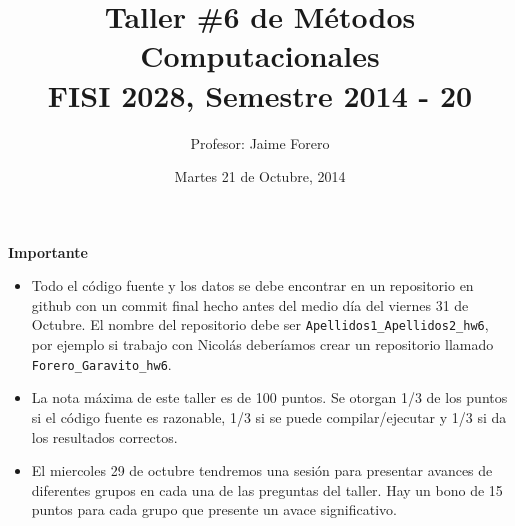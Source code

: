 \documentclass{article}
\title{Taller \#6 de M\'etodos Computacionales\\ FISI 2028, Semestre 2014 - 20}
\author{Profesor: Jaime Forero}
\date{Martes 21 de Octubre, 2014}
\begin{document}
\maketitle
\thispagestyle{empty}


{\bf Importante}
\begin{itemize}

\item Todo el c\'odigo fuente y los datos se debe encontrar en un
  repositorio en github con un commit final hecho antes del medio
  d\'ia del viernes 31 de Octubre. El nombre del repositorio debe ser
  \verb"Apellidos1_Apellidos2_hw6", por ejemplo si trabajo con
  Nicol\'as deber\'iamos crear un repositorio llamado
  \verb"Forero_Garavito_hw6".  

\item 
  La nota m\'axima de este taller es de 100 puntos. Se otorgan 1/3
  de los puntos si el c\'odigo fuente es razonable, 1/3 si se puede
  compilar/ejecutar y 1/3 si da los resultados correctos.  

\item
  El miercoles 29 de octubre tendremos una sesi\'on para presentar
  avances de diferentes grupos en cada una de las preguntas del
  taller. Hay un bono de 15 puntos para cada grupo que presente un
  avace significativo.  


\end{itemize}
\end{document}
